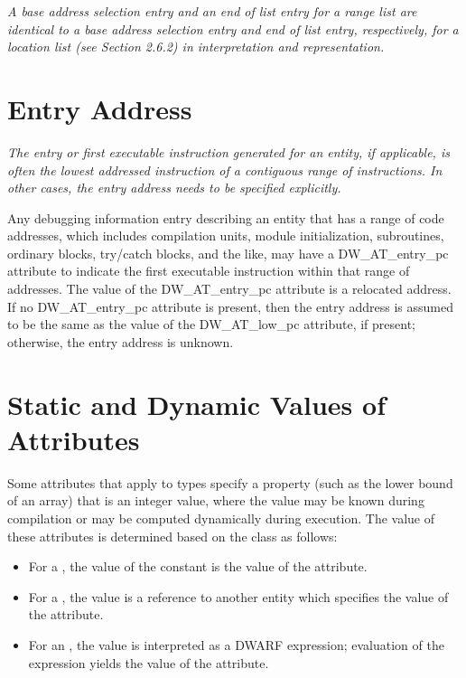 \textit{A base address selection entry and an end of list entry for
a range list are identical to a base address selection entry
and end of list entry, respectively, for a location list
(see Section 2.6.2) in interpretation and representation.}



\section{Entry Address}
\label{chap:entryaddress}
\textit{The entry or first executable instruction generated
for an entity, if applicable, is often the lowest addressed
instruction of a contiguous range of instructions. In other
cases, the entry address needs to be specified explicitly.}

Any debugging information entry describing an entity that has
a range of code addresses, which includes compilation units,
module initialization, subroutines, ordinary blocks, try/catch
blocks, and the like, may have a DW\-\_AT\-\_entry\-\_pc attribute to
indicate the first executable instruction within that range
of addresses. The value of the DW\-\_AT\-\_entry\-\_pc attribute is a
relocated address. If no DW\-\_AT\-\_entry\-\_pc attribute is present,
then the entry address is assumed to be the same as the
value of the DW\-\_AT\-\_low\-\_pc attribute, if present; otherwise,
the entry address is unknown.

\section{Static and Dynamic Values of Attributes}
\label{chap:staticanddynamicvaluesofattributes}

Some attributes that apply to types specify a property (such
as the lower bound of an array) that is an integer value,
where the value may be known during compilation or may be
computed dynamically during execution.  The value of these
attributes is determined based on the class as follows:

\begin{itemize}
\item For a , the value of the constant is the value of
the attribute.

\item For a , the
value is a reference to another
entity which specifies the value of the attribute.

\item For an , the value is interpreted as a 
DWARF expression; 
evaluation of the expression yields the value of
the attribute.
\end{itemize}

